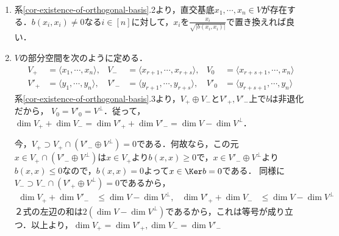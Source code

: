 \documentclass[uplatex, dvipdfmx]{jsreport}
\begin{document}
\begin{Proof}\mbox{}
    \begin{enumerate}
        \item 系\ref{cor-existence-of-orthogonal-basis}.2より，直交基底$x_1,\cdots,x_n\in V$が存在する．$b(x_i,x_i)\ne 0$なる$i\in[n]$に対して，$x_i$を$\frac{x_i}{\sqrt{|b(x_i,x_i)|}}$で置き換えれば良い．
        \item $V$の部分空間を次のように定める．\begin{align*}
            V_+&=\langle x_1,\cdots,x_n\rangle,&V_-&=\langle x_{r+1},\cdots,x_{r+s}\rangle,&V_0&=\langle x_{r+s+1},\cdots,x_n\rangle\\
            V'_+&=\langle y_1,\cdots,y_n\rangle,&V'_-&=\langle y_{r+1},\cdots,y_{r+s}\rangle,&V'_0&=\langle y_{r+s+1},\cdots,y_n\rangle
        \end{align*}
        系\ref{cor-existence-of-orthogonal-basis}.3より，$V_+\oplus V_-$と$V'_+,V'_-$上で$b$は非退化だから，
        $V_0=V'_0=V^\perp$．従って，$\dim V_++\dim V_-=\dim V'_++\dim V'_-=\dim V-\dim V^\perp$．
        
        今，$V_+\supset V_+\cap(V'_-\oplus V^\perp)=0$である．何故なら，この元$x\in V_+\cap(V'_-\oplus V^\perp)$は$x\in V_+$より$b(x,x)\ge 0$で，$x\in V'_-\oplus V^\perp$より$b(x,x)\le 0$なので，$b(x,x)=0$よって$x\in\Ker b=0$である．
        同様に$V_-\supset V_-\cap(V'_+\oplus V^\perp)=0$であるから，
        \begin{align*}
            \dim V_++\dim V'_-&\le\dim V-\dim V^\perp,&\dim V'_++\dim V_-&\le\dim V-\dim V^\perp
        \end{align*}
        ２式の左辺の和は$2(\dim V-\dim V^\perp)$であるから，これは等号が成り立つ．以上より，$\dim V_+=\dim V'_+,\dim V_-=\dim V'_-$
    \end{enumerate}
\end{Proof}
\end{document}
